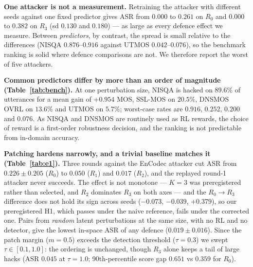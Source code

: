\documentclass[conference]{IEEEtran}
\begin{document}
\noindent\textbf{One attacker is not a measurement.} Retraining the attacker with different seeds against one
fixed predictor gives ASR from $0.000$ to $0.261$ on $R_0$ and $0.000$ to $0.382$ on $R_3$ (sd $0.130$ and
$0.180$) --- as large as every defence effect we measure. Between \emph{predictors}, by contrast, the spread is
small relative to the differences (NISQA $0.876$--$0.916$ against UTMOS $0.042$--$0.076$), so the benchmark
ranking is solid where defence comparisons are not. We therefore report the worst of five attackers.

\noindent\textbf{Common predictors differ by more than an order of magnitude (Table~\ref{tab:bench}).} At
one perturbation size, NISQA is hacked on $89.6\%$ of utterances for a mean gain of $+0.954$ MOS, SSL-MOS on
$20.5\%$, DNSMOS OVRL on $13.6\%$ and UTMOS on $5.7\%$; worst-case rates are $0.916$, $0.252$, $0.200$ and
$0.076$. As NISQA and DNSMOS are routinely used as RL rewards, the choice of reward is a
first-order robustness decision, and the ranking is not predictable from in-domain accuracy.

\begin{table}[t]
\centering
\caption{\textbf{Auditing the loop.} Corrected-reference ASR per attack space (fresh attacker, BVCC test) and
agreement with human MOS (BVCC system SRCC; out-of-domain mean over 12 sets), mean$\pm$sd over 3 seeds.}
\label{tab:e1}
\scriptsize
\setlength{\tabcolsep}{3.5pt}

\end{table}

\noindent\textbf{Patching hardens narrowly, and a trivial baseline matches it (Table~\ref{tab:e1}).} Three
rounds against the EnCodec attacker cut ASR from $0.226\!\pm\!0.205$ ($R_0$) to $0.050$ ($R_1$) and $0.017$
($R_2$), and the replayed round-1 attacker never succeeds. The effect is not monotone --- $K\!=\!3$ was
preregistered rather than selected, and $R_2$ dominates $R_3$ on both axes --- and the $R_0\!\to\!R_3$ difference
does not hold its sign across seeds ($-0.073$, $-0.039$, $+0.379$), so our preregistered H1, which passes under
the naive reference, fails under the corrected one. Pairs from \emph{random} latent perturbations at the same
size, with no RL and no detector, give the lowest in-space ASR of any defence ($0.019\!\pm\!0.016$). Since the
patch margin ($m\!=\!0.5$) exceeds the detection threshold ($\tau\!=\!0.3$) we swept $\tau\in[0.1,1.0]$: the
ordering is unchanged, though $R_3$ alone keeps a tail of large hacks (ASR $0.045$ at $\tau\!=\!1.0$;
90th-percentile score gap $0.651$ vs $0.359$ for $R_0$).
\end{document}
